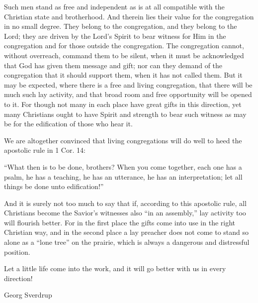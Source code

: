 Such men stand as free and independent as is at all compatible with the Christian state and brotherhood. And therein lies their value for the congregation in no small degree. They belong to the congregation, and they belong to the Lord; they are driven by the Lord’s Spirit to bear witness for Him in the congregation and for those outside the congregation. The congregation cannot, without overreach, command them to be silent, when it must be acknowledged that God has given them message and gift; nor can they demand of the congregation that it should support them, when it has not called them. But it may be expected, where there is a free and living congregation, that there will be much such lay activity, and that broad room and free opportunity will be opened to it. For though not many in each place have great gifts in this direction, yet many Christians ought to have Spirit and strength to bear such witness as may be for the edification of those who hear it.

We are altogether convinced that living congregations will do well to heed the apostolic rule in 1 Cor. 14:

“What then is to be done, brothers? When you come together, each one has a psalm, he has a teaching, he has an utterance, he has an interpretation; let all things be done unto edification!”

And it is surely not too much to say that if, according to this apostolic rule, all Christians become the Savior’s witnesses also “in an assembly,” lay activity too will flourish better. For in the first place the gifts come into use in the right Christian way, and in the second place a lay preacher does not come to stand so alone as a “lone tree” on the prairie, which is always a dangerous and distressful position.

Let a little life come into the work, and it will go better with us in every direction!

Georg Sverdrup

